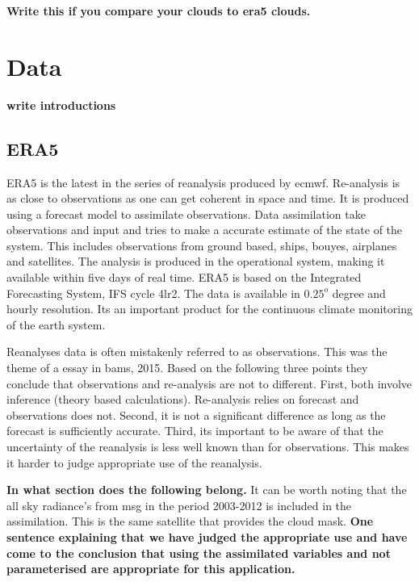 \textbf{Write this if you compare your clouds to era5 clouds.}

\section{Data}
\textbf{write introductions}


\subsection{ERA5} \label{sec:era5}
ERA5 is the latest in the series of reanalysis produced by \acrfull{ecmwf}. Re-analysis is as close to observations as one can get coherent in space and time. It is produced using a forecast model to assimilate observations. Data assimilation take observations and input and tries to make a accurate estimate of the state of the system. This includes observations from ground based, ships, bouyes, airplanes and satellites. The analysis is produced in the operational system, making it available within five days of real time. ERA5 is based on the Integrated Forecasting System, IFS cycle 4lr2. The data is available in $0.25^o$ degree and hourly resolution. Its an important product for the continuous climate monitoring of the earth system. 

Reanalyses data is often mistakenly referred to as observations. This was the theme of a essay in \acrfull{bams}, 2015. Based on the following three points they conclude that observations and re-analysis are not to different. First, both involve inference (theory based calculations). Re-analysis relies on forecast and observations does not. Second, it is not a significant difference as long as the forecast is sufficiently accurate. Third, its important to be aware of that the uncertainty of the reanalysis is less well known than for observations. This makes it harder to judge appropriate use of the reanalysis. 

\textbf{In what section does the following belong.}
It can be worth noting that the all sky radiance's from \acrfull{msg} in the period 2003-2012 is included in the assimilation. This is the same satellite that provides the cloud mask. 
\textbf{One sentence explaining that we have judged the appropriate use and have come to the conclusion that using the assimilated variables and not parameterised are appropriate for this application.}

